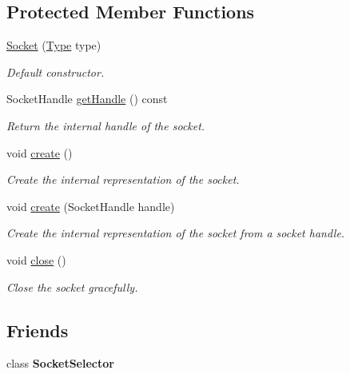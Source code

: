 \subsection*{Protected Member Functions}
\begin{DoxyCompactItemize}
\item 
\hyperlink{classsf_1_1_socket_a80ffb47ec0bafc83af019055d3e6a303}{Socket} (\hyperlink{classsf_1_1_socket_a5d3ff44e56e68f02816bb0fabc34adf8}{Type} type)
\begin{DoxyCompactList}\small\item\em Default constructor. \end{DoxyCompactList}\item 
Socket\+Handle \hyperlink{classsf_1_1_socket_a675457784284ae2f5640bbbe16729393}{get\+Handle} () const
\begin{DoxyCompactList}\small\item\em Return the internal handle of the socket. \end{DoxyCompactList}\item 
void \hyperlink{classsf_1_1_socket_aafbe140f4b1921e0d19e88cf7a61dcbc}{create} ()
\begin{DoxyCompactList}\small\item\em Create the internal representation of the socket. \end{DoxyCompactList}\item 
void \hyperlink{classsf_1_1_socket_af1dd898f7aa3ead7ff7b2d1c20e97781}{create} (Socket\+Handle handle)
\begin{DoxyCompactList}\small\item\em Create the internal representation of the socket from a socket handle. \end{DoxyCompactList}\item 
void \hyperlink{classsf_1_1_socket_a71f2f5c2aa99e01cafe824fee4c573be}{close} ()
\begin{DoxyCompactList}\small\item\em Close the socket gracefully. \end{DoxyCompactList}\end{DoxyCompactItemize}
\subsection*{Friends}
\begin{DoxyCompactItemize}
\item 
\mbox{\label{classsf_1_1_socket_a23fafd48278ea4f8f9c25f1f0f43693c}} 
class {\bfseries Socket\+Selector}
\end{DoxyCompactItemize}


